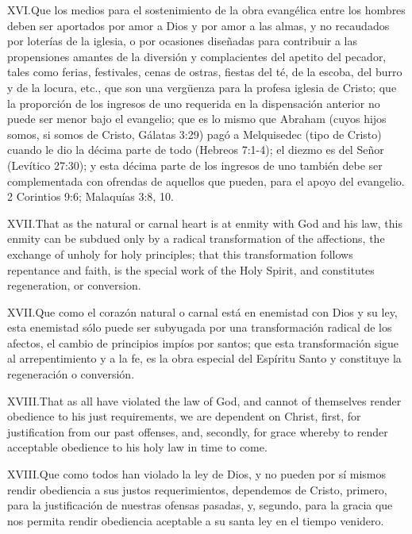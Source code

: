 \lettrine{XVI.} Que los medios para el sostenimiento de la obra evangélica entre los hombres deben ser aportados por amor a Dios y por amor a las almas, y no recaudados por loterías de la iglesia, o por ocasiones diseñadas para contribuir a las propensiones amantes de la diversión y complacientes del apetito del pecador, tales como ferias, festivales, cenas de ostras, fiestas del té, de la escoba, del burro y de la locura, etc., que son una vergüenza para la profesa iglesia de Cristo; que la proporción de los ingresos de uno requerida en la dispensación anterior no puede ser menor bajo el evangelio; que es lo mismo que Abraham (cuyos hijos somos, si somos de Cristo, Gálatas 3:29) pagó a Melquisedec (tipo de Cristo) cuando le dio la décima parte de todo (Hebreos 7:1-4); el diezmo es del Señor (Levítico 27:30); y esta décima parte de los ingresos de uno también debe ser complementada con ofrendas de aquellos que pueden, para el apoyo del evangelio. 2 Corintios 9:6; Malaquías 3:8, 10.


\lettrine{XVII.} That as the natural or carnal heart is at enmity with God and his law, this enmity can be subdued only by a radical transformation of the affections, the exchange of unholy for holy principles; that this transformation follows repentance and faith, is the special work of the Holy Spirit, and constitutes regeneration, or conversion.


\lettrine{XVII.} Que como el corazón natural o carnal está en enemistad con Dios y su ley, esta enemistad sólo puede ser subyugada por una transformación radical de los afectos, el cambio de principios impíos por santos; que esta transformación sigue al arrepentimiento y a la fe, es la obra especial del Espíritu Santo y constituye la regeneración o conversión.


\lettrine{XVIII.} That as all have violated the law of God, and cannot of themselves render obedience to his just requirements, we are dependent on Christ, first, for justification from our past offenses, and, secondly, for grace whereby to render acceptable obedience to his holy law in time to come.


\lettrine{XVIII.} Que como todos han violado la ley de Dios, y no pueden por sí mismos rendir obediencia a sus justos requerimientos, dependemos de Cristo, primero, para la justificación de nuestras ofensas pasadas, y, segundo, para la gracia que nos permita rendir obediencia aceptable a su santa ley en el tiempo venidero.


